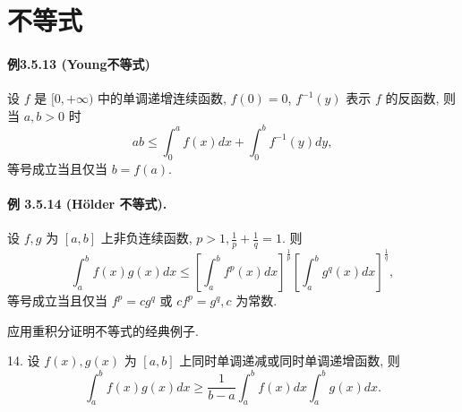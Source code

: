 
\section{不等式}

\paragraph{例3.5.13 (Young不等式)}

设 $f$ 是 $[0,+\infty)$ 中的单调递增连续函数, $f(0)=0$, $f^{-1}(y)$ 表示 $f$
的反函数, 则当 $a,b>0$ 时 
\[
ab\leqslant\int_{0}^{a}f(x)dx+\int_{0}^{b}f^{-1}(y)dy,
\]
等号成立当且仅当 $b=f(a)$.

\paragraph{例 3.5.14 (Hölder 不等式). }

设 $f,g$ 为 $[a,b]$ 上非负连续函数, $p>1,\frac{1}{p}+\frac{1}{q}=1$. 则 
\[
\int_{a}^{b}f(x)g(x)dx\leqslant\left[\int_{a}^{b}f^{p}(x)dx\right]^{\frac{1}{p}}\left[\int_{a}^{b}g^{q}(x)dx\right]^{\frac{1}{q}},
\]
等号成立当且仅当 $f^{p}=cg^{q}$ 或 $cf^{p}=g^{q},c$ 为常数.

应用重积分证明不等式的经典例子.

14. 设 $f(x),g(x)$ 为 $[a,b]$ 上同时单调递减或同时单调递增函数, 则 
\[
\int_{a}^{b}f(x)g(x)dx\geqslant\frac{1}{b-a}\int_{a}^{b}f(x)dx\int_{a}^{b}g(x)dx.
\]

